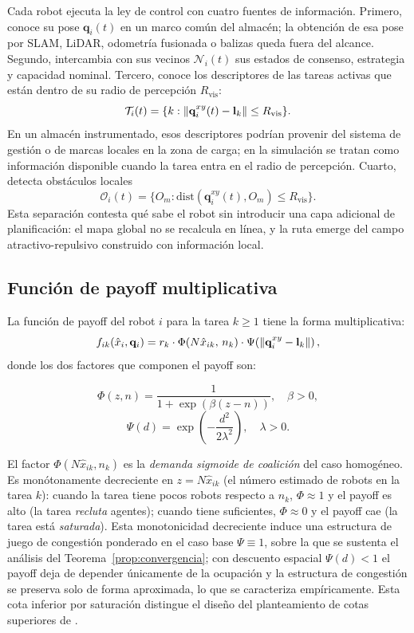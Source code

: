 Cada robot ejecuta la ley de control con cuatro fuentes de información. Primero, conoce
su pose $\mathbf{q}_i(t)$ en un marco común del almacén; la obtención de esa pose por
SLAM, LiDAR, odometría fusionada o balizas queda fuera del alcance. Segundo, intercambia
con sus vecinos $\mathcal{N}_i(t)$ sus estados de consenso, estrategia y capacidad
nominal. Tercero, conoce los descriptores de las tareas activas que están dentro de su
radio de percepción $R_{\mathrm{vis}}$:
\[
  \mathcal{T}_i(t)=
  \{k:\left\|\mathbf{q}_i^{xy}(t)-\mathbf{l}_k\right\|\leq R_{\mathrm{vis}}\}.
\]
En un almacén instrumentado, esos descriptores podrían provenir del sistema de gestión
o de marcas locales en la zona de carga; en la simulación se tratan como información
disponible cuando la tarea entra en el radio de percepción. Cuarto, detecta obstáculos
locales
\[
  \mathcal{O}_i(t)=
  \{O_m:\mathrm{dist}(\mathbf{q}_i^{xy}(t),O_m)\leq R_{\mathrm{vis}}\}.
\]
Esta separación contesta qué sabe el robot sin introducir una capa adicional de
planificación: el mapa global no se recalcula en línea, y la ruta emerge del campo
atractivo-repulsivo construido con información local.

\subsection{Función de payoff multiplicativa}

La función de payoff del robot $i$ para la tarea $k \geq 1$ tiene la forma
multiplicativa:
\begin{equation}
  f_{ik}(\hat{x}_i, \mathbf{q}_i) = r_k \cdot \Phi\!\left(N\hat{x}_{ik},\, n_k\right)
    \cdot \Psi\!\left(\left\|\mathbf{q}_i^{xy} - \mathbf{l}_k\right\|\right),
  \label{eq:payoff}
\end{equation}
donde los dos factores que componen el payoff son:

\begin{equation}
  \Phi(z, n) = \frac{1}{1 + \exp\!\left(\beta(z - n)\right)},
  \quad \beta > 0,
  \label{eq:sigmoid}
\end{equation}
\begin{equation}
  \Psi(d) = \exp\!\left(-\frac{d^2}{2\lambda^2}\right),
  \quad \lambda > 0.
  \label{eq:gaussian}
\end{equation}

El factor $\Phi(N\hat{x}_{ik}, n_k)$ es la \emph{demanda sigmoide de coalición} del
caso homogéneo.
Es monótonamente decreciente en $z = N\hat{x}_{ik}$ (el número estimado de
robots en la tarea $k$): cuando la tarea tiene pocos robots respecto a $n_k$,
$\Phi \approx 1$ y el payoff es alto (la tarea \emph{recluta} ag\-entes);
cuando tiene suficientes, $\Phi \approx 0$ y el payoff cae (la tarea está
\emph{saturada}). Esta monotonicidad decreciente induce una estructura de juego de
congestión ponderado en el caso base $\Psi\equiv1$, sobre la que se sustenta el
análisis del Teorema~\ref{prop:convergencia}; con descuento espacial $\Psi(d)<1$ el
payoff deja de depender únicamente de la ocupación y la estructura de congestión se
preserva solo de forma aproximada, lo que se caracteriza empíricamente. Esta cota
inferior por saturación distingue el diseño del planteamiento de cotas superiores de
\citet{martinezpiazuelo2022automatica}.

